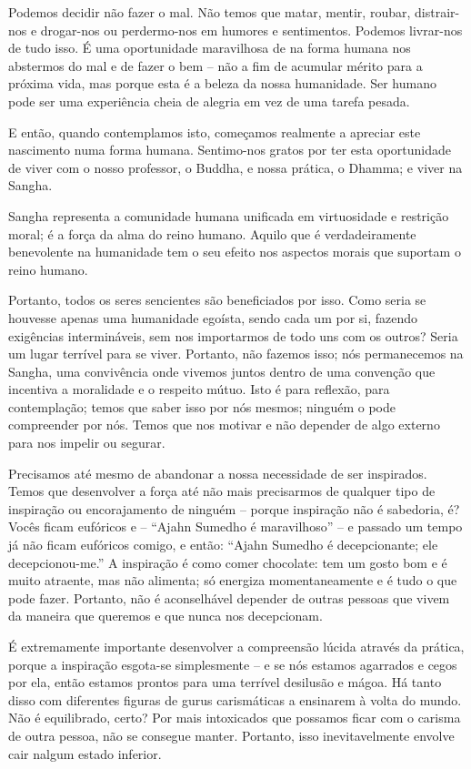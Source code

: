Podemos decidir não fazer o mal. Não temos que matar, mentir, roubar,
distrair-nos e drogar-nos ou perdermo-nos em humores e sentimentos. Podemos
livrar-nos de tudo isso. É uma oportunidade maravilhosa de na forma humana nos
abstermos do mal e de fazer o bem -- não a fim de acumular mérito para a próxima
vida, mas porque esta é a beleza da nossa humanidade. Ser humano pode ser uma
experiência cheia de alegria em vez de uma tarefa pesada.

E então, quando contemplamos isto, começamos realmente a apreciar este
nascimento numa forma humana. Sentimo-nos gratos por ter esta oportunidade de
viver com o nosso professor, o Buddha, e nossa prática, o Dhamma; e viver
na Sangha.

Sangha representa a comunidade humana unificada em virtuosidade e restrição
moral; é a força da alma do reino humano. Aquilo que é verdadeiramente
benevolente na humanidade tem o seu efeito nos aspectos morais que suportam o
reino humano.

Portanto, todos os seres sencientes são beneficiados por isso. Como seria se
houvesse apenas uma humanidade egoísta, sendo cada um por si, fazendo exigências
intermináveis, sem nos importarmos de todo uns com os outros? Seria um lugar
terrível para se viver. Portanto, não fazemos isso; nós permanecemos na Sangha,
uma convivência onde vivemos juntos dentro de uma convenção que incentiva a
moralidade e o respeito mútuo. Isto é para reflexão, para contemplação; temos
que saber isso por nós mesmos; ninguém o pode compreender por nós. Temos que nos
motivar e não depender de algo externo para nos impelir ou segurar.

Precisamos até mesmo de abandonar a nossa necessidade de ser inspirados. Temos
que desenvolver a força até não mais precisarmos de qualquer tipo de inspiração
ou encorajamento de ninguém -- porque inspiração não é sabedoria, é? Vocês ficam
eufóricos e -- ``Ajahn Sumedho é maravilhoso'' -- e passado um tempo já não
ficam eufóricos comigo, e então: ``Ajahn Sumedho é decepcionante; ele
decepcionou-me.'' A inspiração é como comer chocolate: tem um gosto bom e é
muito atraente, mas não alimenta; só energiza momentaneamente e é tudo o que
pode fazer. Portanto, não é aconselhável depender de outras pessoas que vivem da
maneira que queremos e que nunca nos decepcionam.

É extremamente importante desenvolver a compreensão lúcida através da prática,
porque a inspiração esgota-se simplesmente -- e se nós estamos agarrados e cegos
por ela, então estamos prontos para uma terrível desilusão e mágoa. Há tanto
disso com diferentes figuras de gurus carismáticas a ensinarem à volta do mundo.
Não é equilibrado, certo? Por mais intoxicados que possamos ficar com o carisma
de outra pessoa, não se consegue manter. Portanto, isso inevitavelmente envolve
cair nalgum estado inferior.

